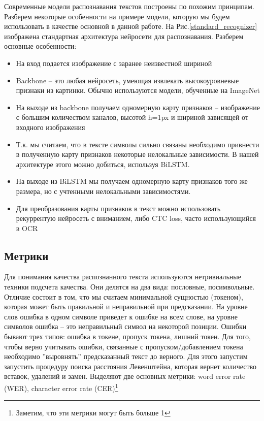 \documentclass[12pt]{article}
\begin{document}
Современные модели распознавания текстов построены по похожим принципам. Разберем некоторые особенности на примере модели, 
которую мы будем использовать в качестве основной в данной работе.
На Рис.\ref{standard_recognizer}  изображена стандартная архитектура нейросети для распознавания. Разберем основные особенности:

\begin{itemize}
    \item На вход подается изображение с заранее неизвестной шириной
    \item Backbone -- это любая нейросеть, умеющая извлекать высокоуровневые признаки из картинки. Обычно используются
    модели, обученные на ImageNet
    \item На выходе из backbone получаем одномерную карту признаков -- изображение с большим количеством каналов, высотой h=1px
    и шириной зависящей от входного изображения
    \item Т.к. мы считаем, что в тексте символы сильно связаны необходимо привнести в полученную карту признаков некоторые нелокальные
    зависимости. В нашей архитектуре этого можно добиться, используя BiLSTM.
    \item На выходе из BiLSTM мы получаем одномерную карту признаков того же размера, но с учтенными нелокальными зависимостями.
    \item Для преобразования карты признаков в текст можно использовать рекуррентую нейросеть с вниманием, либо CTC loss,
    часто использующийся в OCR

\end{itemize}


\subsection{Метрики}

Для понимания качества распознанного текста используются нетривиальные техники подсчета качества.
Они делятся на два вида: пословные, посимвольные. Отличие состоит в том, что мы считаем минимальной сущностью (токеном),
которая может быть правильной и неправильной при предсказании. На уровне слов ошибка в одном символе приведет
к ошибке на всем слове, на уровне символов ошибка -- это неправильный символ на некоторой позиции.
Ошибки бывают трех типов: ошибка в токене, пропуск токена, лишний токен. Для того, чтобы верно учитывать ошибки,
связанные с пропуском/добавлением токена необходимо ''выровнять'' предсказанный текст до верного. Для этого запустим
запустить процедуру поиска расстояния Левенштейна, которая вернет количество вставок, удалений и замен. 
Выделяют две основных метрики: word error rate (WER), character error rate (CER)\footnote{Заметим, что эти метрики могут быть больше 1}
\end{document}
